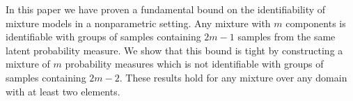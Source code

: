\documentclass{article} %
\theoremstyle{definition}
\begin{document}
In this paper we have proven a fundamental bound on the identifiability of mixture models in a nonparametric setting. Any mixture with $m$ components is identifiable with groups of samples containing $2m-1$ samples from the same latent probability measure. We show that this bound is tight by constructing a mixture of $m$ probability measures which is not identifiable with groups of samples containing $2m-2$. These results hold for any mixture over any domain with at least two elements.


\end{document}
